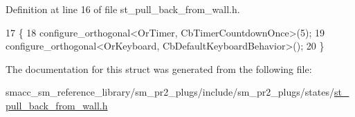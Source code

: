 Definition at line 16 of file st\+\_\+pull\+\_\+back\+\_\+from\+\_\+wall.\+h.


\begin{DoxyCode}
17     \{
18         configure\_orthogonal<OrTimer,  CbTimerCountdownOnce>(5);    
19         configure\_orthogonal<OrKeyboard, CbDefaultKeyboardBehavior>();
20     \}
\end{DoxyCode}


The documentation for this struct was generated from the following file\+:\begin{DoxyCompactItemize}
\item 
smacc\+\_\+sm\+\_\+reference\+\_\+library/sm\+\_\+pr2\+\_\+plugs/include/sm\+\_\+pr2\+\_\+plugs/states/\hyperlink{st__pull__back__from__wall_8h}{st\+\_\+pull\+\_\+back\+\_\+from\+\_\+wall.\+h}\end{DoxyCompactItemize}
